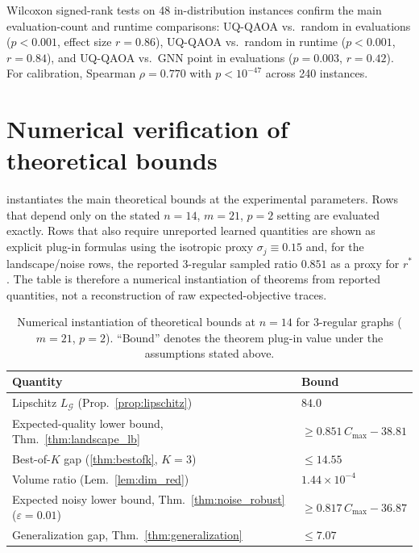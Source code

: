 \documentclass[aps,prx,reprint,superscriptaddress,longbibliography]{revtex4-2}
\newcommand{\GNN}{\textnormal{\textsc{GNN}}}
\newcommand{\UQQAOA}{\textnormal{\textsc{UQ-QAOA}}}
\newcommand{\calG}{\mathcal{G}}
\begin{document}
Wilcoxon signed-rank tests on 48 in-distribution instances confirm
the main evaluation-count and runtime comparisons: \UQQAOA{} vs.\ random in
evaluations ($p < 0.001$, effect size $r = 0.86$), \UQQAOA{} vs.\ random
in runtime ($p < 0.001$, $r = 0.84$), and \UQQAOA{} vs.\ \GNN{} point in
evaluations ($p{=}0.003$, $r = 0.42$). For calibration,
Spearman $\rho{=}0.770$ with $p < 10^{-47}$ across 240 instances.

\section{Numerical verification of theoretical bounds}
\label{app:bound_verification}

 instantiates the main theoretical bounds at the
experimental parameters. Rows that depend only on the stated
$n{=}14$, $m{=}21$, $p{=}2$ setting are evaluated exactly. Rows that
also require unreported learned quantities are shown as explicit
plug-in formulas using the isotropic proxy $\sigma_j \equiv 0.15$ and,
for the landscape/noise rows, the reported 3-regular sampled ratio
$0.851$ as a proxy for $r^*$. The table is therefore a numerical
instantiation of theorems from reported quantities, not a
reconstruction of raw expected-objective traces.

\begin{table}[h]
\caption{Numerical instantiation of theoretical bounds at $n{=}14$ for
3-regular graphs ($m{=}21$, $p{=}2$). ``Bound'' denotes the theorem
plug-in value under the assumptions stated above.
\label{tab:bounds}}
\begin{ruledtabular}
\scriptsize
\begin{tabular}{p{}p{}}
    Quantity & Bound \\
    \hline
    Lipschitz $L_\calG$ (Prop.~\ref{prop:lipschitz})
        & $84.0$ \\
        Expected-quality lower bound, Thm.~\ref{thm:landscape_lb}
        & $\ge 0.851\,C_{\max} - 38.81$ \\
    Best-of-$K$ gap (\ref{thm:bestofk}, $K{=}3$)
        & $\le 14.55$ \\
    Volume ratio (Lem.~\ref{lem:dim_red})
            & $1.44{\times}10^{-4}$ \\
        Expected noisy lower bound, Thm.~\ref{thm:noise_robust} ($\varepsilon{=}0.01$)
        & $\ge 0.817\,C_{\max} - 36.87$ \\
    Generalization gap, Thm.~\ref{thm:generalization}
            & $\le 7.07$ \\
\end{tabular}
\end{ruledtabular}
\end{table}
\end{document}
